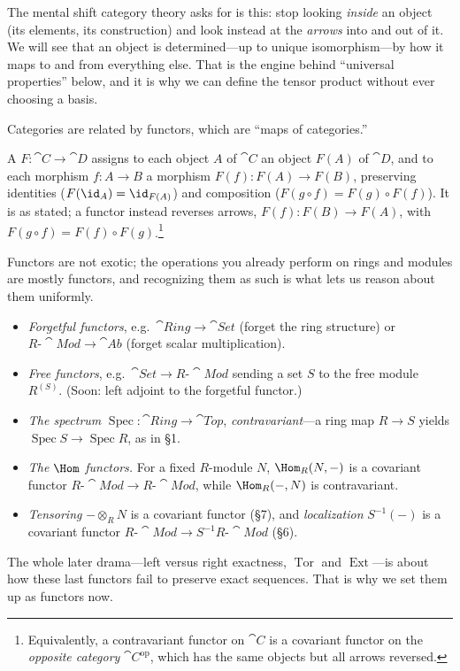 \documentclass[11pt]{article}
\DeclareMathOperator{\Spec}{Spec}
\DeclareMathOperator{\Tor}{Tor}
\DeclareMathOperator{\Ext}{Ext}
\begin{document}
\begin{iintuition}
The mental shift category theory asks for is this: stop looking \emph{inside} an object (its
elements, its construction) and look instead at the \emph{arrows} into and out of it. We
will see that an object is determined---up to unique isomorphism---by how it maps to and from
everything else. That is the engine behind ``universal properties'' below, and it is why we
can define the tensor product without ever choosing a basis.
\end{iintuition}

Categories are related by functors, which are ``maps of categories.''

\begin{ddefinition}[Functor]
A  $F\colon\cat{C}\to\cat{D}$ assigns to each object $A$ of $\cat{C}$ an
object $F(A)$ of $\cat{D}$, and to each morphism $f\colon A\to B$ a morphism
$F(f)\colon F(A)\to F(B)$, preserving identities ($F(\id_A)=\id_{F(A)}$) and composition
($F(g\circ f)=F(g)\circ F(f)$). It is  as stated; a 
functor instead reverses arrows, $F(f)\colon F(B)\to F(A)$, with $F(g\circ f)=F(f)\circ
F(g)$.\footnote{Equivalently, a contravariant functor on $\cat{C}$ is a covariant functor on
the \emph{opposite category} $\cat{C}^{\mathrm{op}}$, which has the same objects but all
arrows reversed.}
\end{ddefinition}

Functors are not exotic; the operations you already perform on rings and modules are mostly
functors, and recognizing them as such is what lets us reason about them uniformly.

\begin{eexample}
\begin{itemize}\setlength{\itemsep}{2pt}
\item \emph{Forgetful functors}, e.g.\ $\cat{Ring}\to\cat{Set}$ (forget the ring structure)
or $R\text{-}\cat{Mod}\to\cat{Ab}$ (forget scalar multiplication).
\item \emph{Free functors}, e.g.\ $\cat{Set}\to R\text{-}\cat{Mod}$ sending a set $S$ to the
free module $R^{(S)}$. (Soon: left adjoint to the forgetful functor.)
\item \emph{The spectrum} $\Spec\colon\cat{Ring}\to\cat{Top}$, \emph{contravariant}---a ring
map $R\to S$ yields $\Spec S\to\Spec R$, as in \S1.
\item \emph{The $\Hom$ functors.} For a fixed $R$-module $N$, $\Hom_R(N,-)$ is a covariant
functor $R\text{-}\cat{Mod}\to R\text{-}\cat{Mod}$, while $\Hom_R(-,N)$ is contravariant.
\item \emph{Tensoring} $-\otimes_R N$ is a covariant functor (\S7), and \emph{localization}
$S^{-1}(-)$ is a covariant functor $R\text{-}\cat{Mod}\to S^{-1}R\text{-}\cat{Mod}$ (\S6).
\end{itemize}
The whole later drama---left versus right exactness, $\Tor$ and $\Ext$---is about how these
last functors fail to preserve exact sequences. That is why we set them up as functors now.
\end{eexample}
\end{document}
